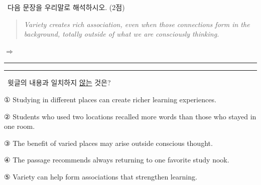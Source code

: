\documentclass[11pt,a4paper]{article}
\newcommand{\qno}[1]{\par\vspace{8pt}\noindent{\sffamily\bfseries #1.}\ }
\newcommand{\instr}[1]{{\sffamily #1}\par\vspace{3pt}}
\begin{document}
\qno{3}\instr{[서술형] 다음 문장을 우리말로 해석하시오. \normalfont(2점)}

\begin{quote}
\itshape
Variety creates rich association, even when those connections form in the
background, totally outside of what we are consciously thinking.
\end{quote}

\noindent $\Rightarrow$ \rule{\linewidth}{0.4pt}

\vspace{4pt}
\noindent \rule{\linewidth}{0.4pt}

\qno{4}\instr{윗글의 내용과 일치하지 \underline{않는} 것은?}
\begin{choices}
\item ① Studying in different places can create richer learning experiences.
\item ② Students who used two locations recalled more words than those who stayed in one room.
\item ③ The benefit of varied places may arise outside conscious thought.
\item ④ The passage recommends always returning to one favorite study nook.
\item ⑤ Variety can help form associations that strengthen learning.
\end{choices}
\end{document}
